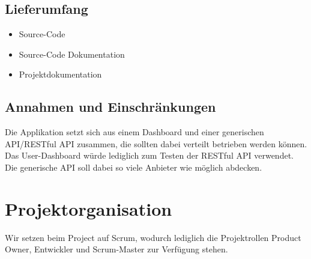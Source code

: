 \subsection{Lieferumfang}
\begin{itemize}
  \item Source-Code
  \item Source-Code Dokumentation
  \item Projektdokumentation
\end{itemize}

\subsection{Annahmen und Einschränkungen}
Die Applikation setzt sich aus einem Dashboard und einer generischen 
API/RESTful API
zusammen, die sollten dabei verteilt betrieben werden können.
Das User-Dashboard würde lediglich zum Testen der RESTful API verwendet.
Die generische API soll dabei so viele Anbieter wie möglich abdecken.
\section{Projektorganisation}
Wir setzen beim Project auf Scrum\autocite{scrum}, wodurch lediglich die Projektrollen Product 
Owner, Entwickler und Scrum-Master zur Verfügung stehen.
